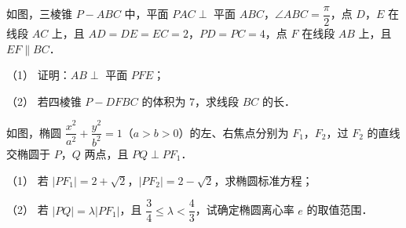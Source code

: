 \begin{question}
如图，三棱锥 $P-ABC$ 中，平面 $PAC\perp$ 平面 $ABC$，$\angle ABC=\dfrac{\pi}{2}$，点 $D$，$E$ 在线段 $AC$ 上，且 $AD=DE=EC=2$，$PD=PC=4$，点 $F$ 在线段 $AB$ 上，且 $EF\parallel BC$．

（1） 证明：$AB\perp$ 平面 $PFE$；

（2） 若四棱锥 $P-DFBC$ 的体积为 $7$，求线段 $BC$ 的长．
\nopagebreak[4]
\begin{center}\end{center}
\nopagebreak[4]
\Needspace{0.4\textheight}
\end{question}
\begin{question}
如图，椭圆 $\dfrac{x^{2}}{a^{2}}+\dfrac{y^{2}}{b^{2}}=1$（$a>b>0$）的左、右焦点分别为 $F_{1}$，$F_{2}$，过 $F_{2}$ 的直线交椭圆于 $P$，$Q$ 两点，且 $PQ\perp PF_{1}$．

（1） 若 $|PF_{1}|=2+\sqrt{2}$，$|PF_{2}|=2-\sqrt{2}$，求椭圆标准方程；

（2） 若 $|PQ|=\lambda|PF_{1}|$，且 $\dfrac{3}{4}\le\lambda<\dfrac{4}{3}$，试确定椭圆离心率 $e$ 的取值范围．
\nopagebreak[4]
\begin{center}\end{center}
\nopagebreak[4]

\end{question}